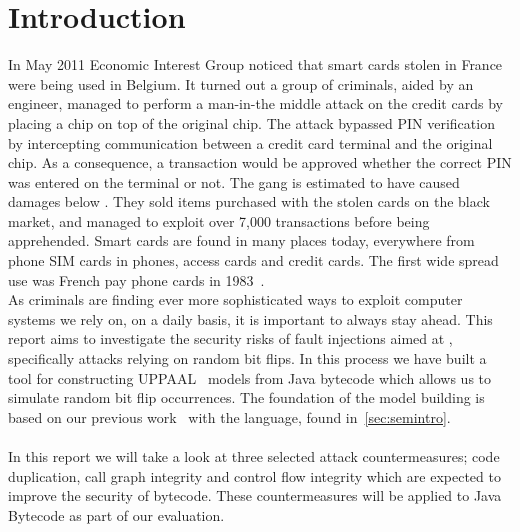 \chapter{Introduction}
In May 2011 Economic Interest Group noticed that smart cards stolen in France were being used in Belgium\cite{fun}. It turned out a group of criminals, aided by an engineer, managed to perform a man-in-the middle attack on the credit cards by placing a chip on top of the original chip. The attack bypassed PIN verification by intercepting communication between a credit card terminal and the original chip. As a consequence, a transaction would be approved whether the correct PIN was entered on the terminal or not. The gang is estimated to have caused damages below . They sold items purchased with the stolen cards on the black market, and managed to exploit over 7,000 transactions before being apprehended. Smart cards are found in many places today, everywhere from phone SIM cards in phones, access cards and credit cards. The first wide spread use was French pay phone cards in 1983~\cite[p. 366]{modbank}.\\

\noindent As criminals are finding ever more sophisticated ways to exploit computer systems we rely on, on a daily basis, it is important to always stay ahead.
This report aims to investigate the security risks of fault injections aimed at \jc, specifically attacks relying on random bit flips. 
In this process we have built a tool for constructing UPPAAL~\cite{upptut} models from Java bytecode which allows us to simulate random bit flip occurrences. 
The foundation of the model building is based on our previous work~\cite{javasec} with the \jcl language, found in~\cref{sec:semintro}.\\\\
In this report we will take a look at three selected attack countermeasures; code duplication, call graph integrity and control flow integrity which are expected to improve the security of \jc bytecode. 
These countermeasures will be applied to Java Bytecode as part of our evaluation.